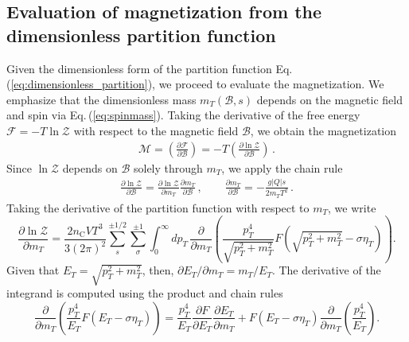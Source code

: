 \documentclass[epjST]{svjour}
\newcommand{\req}[1]{Eq.\,(\ref{#1})}
\begin{document}
\subsection{Evaluation of magnetization from the dimensionless partition function}
\label{sec:magnetization_evaluation}
Given the dimensionless form of the partition function \req{eq:dimensionless_partition}, we proceed to evaluate the magnetization. We emphasize that the dimensionless mass \(m_{T}(\mathcal{B},s)\) depends on the magnetic field and spin via \req{eq:spinmass}. Taking the derivative of the free energy \(\mathcal{F} = -T \ln\mathcal{Z}\) with respect to the magnetic field \(\mathcal{B}\), we obtain the magnetization
\begin{align}
    \label{eq:magnetization_def}
    \mathcal{M} = \left( \frac{\partial \mathcal{F}}{\partial \mathcal{B}} \right) = -T \left( \frac{\partial \ln\mathcal{Z}}{\partial \mathcal{B}} \right)\,.
\end{align} 
Since \(\ln\mathcal{Z}\) depends on \(\mathcal{B}\) solely through \(m_{T}\), we apply the chain rule
\begin{align}
    \label{eq:chain_rule}
    \frac{\partial \ln\mathcal{Z}}{\partial \mathcal{B}} = \frac{\partial \ln\mathcal{Z}}{\partial m_{T}} \frac{\partial m_{T}}{\partial \mathcal{B}}\,,\qquad
    \frac{\partial m_{T}}{\partial \mathcal{B}} = -\frac{g|Q|s}{2m_{T}T^2}\,.
\end{align}
Taking the derivative of the partition function with respect to \(m_{T}\), we write
\begin{equation}
    \frac{\partial \ln \mathcal{Z}}{\partial m_{T}} = \frac{2 n_\mathrm{C} V T^{3}}{3 (2\pi)^{2}} \sum_{s}^{\pm1/2}\sum_{\sigma}^{\pm1} \int_{0}^{\infty} dp_{T} \, \frac{\partial}{\partial m_{T}} \left( \frac{p_{T}^{4}}{\sqrt{p_{T}^{2} + m_{T}^{2}}} F\left(\sqrt{p_{T}^{2} + m_{T}^{2}} - \sigma \eta_{T} \right) \right).
\end{equation}
Given that \(E_{T} = \sqrt{p_{T}^{2} + m_{T}^{2}}\), then, \(\partial E_{T} / \partial m_{T} = m_{T} / E_{T}\). The derivative of the integrand is computed using the product and chain rules
\begin{equation}
    \frac{\partial}{\partial m_{T}} \left( \frac{p_{T}^{4}}{E_{T}} F(E_{T} - \sigma\eta_{T}) \right) = \frac{p_{T}^{4}}{E_{T}} \frac{\partial F}{\partial E_{T}} \frac{\partial E_{T}}{\partial m_{T}} + F(E_{T} - \sigma\eta_{T}) \frac{\partial}{\partial m_{T}} \left( \frac{p_{T}^{4}}{E_{T}} \right).
\end{equation}
\end{document}
